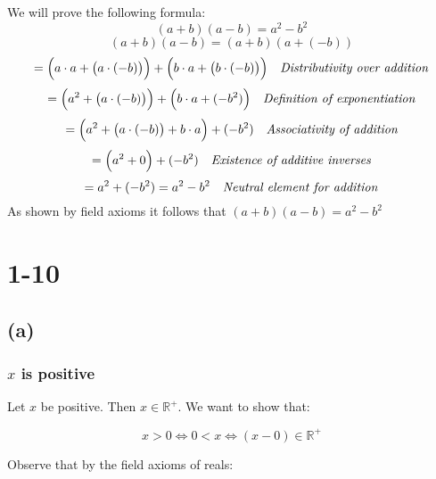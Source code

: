 \documentclass{article}
\begin{document}
We will prove the following formula:
\begin{equation*}
    (a + b)(a - b) = a^2 - b^2
\end{equation*}
\newline
\begin{equation*}
    (a + b)(a - b) = (a + b)(a +  (-b))
\end{equation*}
\begin{equation*}
    = \Big( a \cdot a + \big(a \cdot (-b)\big)\Big) + \Big( b \cdot a + \big(b \cdot (-b)\big)\Big) \ \ \ \mbox{\emph{Distributivity over addition}}
\end{equation*}
\begin{equation*}
    = \Big( a^2 + \big(a \cdot (-b)\big)\Big) + \Big( b \cdot a + (-b^2) \Big) \ \ \ \mbox{\emph{Definition of exponentiation}}
\end{equation*}
\begin{equation*}
    = \Big( a^2 + \big(a \cdot (-b)\big) + b \cdot a \Big) + (-b^2)  \ \ \ \mbox{\emph{Associativity of addition}}
\end{equation*}
\begin{equation*}
    = \Big( a^2 + 0 \Big) + (-b^2)  \ \ \ \mbox{\emph{Existence of additive inverses}}
\end{equation*}
\begin{equation*}
    = a^2  + (-b^2) = a^2 - b^2  \ \ \ \mbox{\emph{Neutral element for addition}}
\end{equation*}
As shown by field axioms it follows that \((a + b)(a - b) = a^2 - b^2 \)

\section*{1-10}
\subsection*{(a)}
\subsubsection*{\(x\) is positive}

Let \(x\) be positive. Then \(x \in \mathbb{R^{+}}\). We want to show that:

\begin{equation*}
    x > 0 \iff 0 < x \iff (x - 0) \in \mathbb{R^{+}}
\end{equation*}

Observe that by the field axioms of reals:
\end{document}
